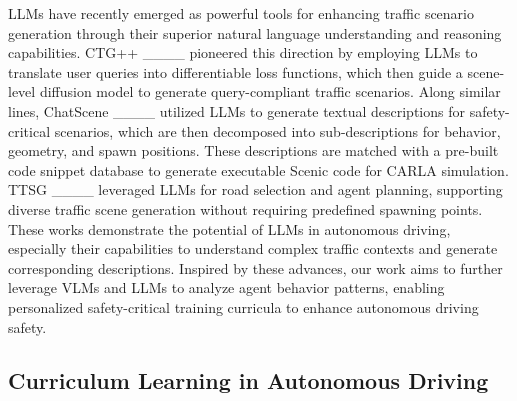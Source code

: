LLMs have recently emerged as powerful tools for enhancing traffic scenario generation through their superior natural language understanding and reasoning capabilities. CTG++ ____ pioneered this direction by employing LLMs to translate user queries into differentiable loss functions, which then guide a scene-level diffusion model to generate query-compliant traffic scenarios. Along similar lines, ChatScene ____ utilized LLMs to generate textual descriptions for safety-critical scenarios, which are then decomposed into sub-descriptions for behavior, geometry, and spawn positions. These descriptions are matched with a pre-built code snippet database to generate executable Scenic code for CARLA simulation. TTSG ____ leveraged LLMs for road selection and agent planning, supporting diverse traffic scene generation without requiring predefined spawning points. These works demonstrate the potential of LLMs in autonomous driving, especially their capabilities to understand complex traffic contexts and generate corresponding descriptions. Inspired by these advances, our work aims to further leverage VLMs and LLMs to analyze agent behavior patterns, enabling personalized safety-critical training curricula to enhance autonomous driving safety.


\subsection{Curriculum Learning in Autonomous Driving}

